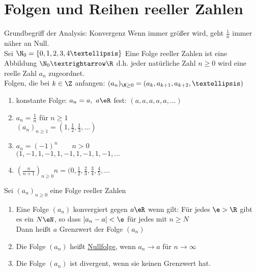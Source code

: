 \chapter{Folgen und Reihen reeller Zahlen}
Grundbegriff der Analysis: Konvergenz
\bsp
Wenn \nN{} immer größer wird, geht $\frac{1}{n}$ immer näher an Null.\\
Sei $\N_0=\{0,1,2,3,4…\}$
\Def
Eine Folge reeller Zahlen ist eine Abbildung $\N_0→\R$ d.h. jeder natürliche Zahl $n\geq 0$ wird eine reelle Zahl $a_n$ zugeordnet.\\
Folgen, die bei $k\in\Z$ anfangen: $(a_n)_{\N\geq 0}=(a_k,a_{k+1},a_{k+2},…)$
\bsp
\begin{enumerate}
\item{konstante Folge: $a_n=a,\ a\eR$ fest: $(a,a,a,a,a,…)$}
\item{$a_n=\frac{1}{n}$ für $n\geq 1$\\
$(a_n)_{n\geq 1}=(1,\frac{1}{2},\frac{1}{3},…)$}
\item{$a_n=(-1)^n\qquad n>0$\\
$(1,-1,1,-1,1,-1,1,-1,1,-1,…$}
\item{$(\frac{n}{n+1})_{n\geq 0}n=(0,\frac{1}{2},\frac{2}{3},\frac{3}{4},\frac{4}{5},…$}
\end{enumerate}
%
\Def
Sei $(a_n)_{n\geq 0}$ eine Folge reeller Zahlen
\begin{enumerate}
\item{Eine Folge $(a_n)$ konvergiert gegen $a\eR$ wenn gilt: Für jedes $\e>\R$ gibt es ein $N\eN$, so dass $|a_n-a|<\e$ für jedes \nN{} mit $n\geq N$\\
Dann heißt $a$ Grenzwert der Folge $(a_n)$\\
}
\item{Die Folge $(a_n)$ heißt \underline{Nullfolge}, wenn $a_n→a$ für $n→∞$}
\item{Die Folge $(a_n)$ ist divergent, wenn sie keinen Grenzwert hat.}
\end{enumerate}
%
\bsp
